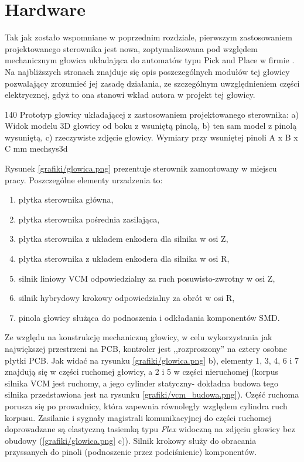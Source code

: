 \section{Hardware}

Tak jak zostało wspomniane w poprzednim rozdziale, pierwszym zastosowaniem projektowanego sterownika jest nowa, zoptymalizowana pod względem mechanicznym głowica układająca do automatów typu Pick and Place w firmie \firma{}. Na najbliższych stronach znajduje się opis poszczególnych modułów tej głowicy pozwalający zrozumieć jej zasadę działania, ze szczególnym uwzględnieniem części elektrycznej, gdyż to ona stanowi wkład autora w projekt tej głowicy.

	{140}
	{Prototyp głowicy układającej z zastosowaniem projektowanego sterownika: a) Widok modelu 3D głowicy od boku z wsuniętą pinolą, b) ten sam model z pinolą wysuniętą, c) rzeczywiste zdjęcie głowicy. Wymiary przy wsuniętej pinoli A x B x C mm}
	{mechsys3d}

Rysunek \ref{grafiki/glowica.png} prezentuje sterownik zamontowany w miejscu pracy. Poszczególne elementy urzadzenia to:

\begin{enumerate}
	\item płytka sterownika główna,
	\item płytka sterownika pośrednia zasilająca,
	\item płytka sterownika z układem enkodera dla silnika w osi Z,
	\item płytka sterownika z układem enkodera dla silnika w osi R,
	\item silnik liniowy VCM odpowiedzialny za ruch posuwisto-zwrotny w osi Z,
	\item silnik hybrydowy krokowy odpowiedzialny za obrót w osi R,
	\item pinola głowicy służąca do podnoszenia i odkładania komponentów SMD.
\end{enumerate}

Ze względu na konstrukcję mechaniczną głowicy, w celu wykorzystania jak największej przestrzeni na PCB, kontroler jest ,,rozproszony'' na cztery osobne płytki PCB. Jak widać na rysunku \ref{grafiki/glowica.png} b), elementy 1, 3, 4, 6 i 7 znajdują się w części ruchomej głowicy, a 2 i 5 w części nieruchomej (korpus silnika VCM jest ruchomy, a jego cylinder statyczny- dokładna budowa tego silnika przedstawiona jest na rysunku \ref{grafiki/vcm_budowa.png}). Część ruchoma porusza się po prowadnicy, która zapewnia równoległy względem cylindra ruch korpusu. Zasilanie i sygnały magistrali komunikacyjnej do części ruchomej doprowadzane są elastyczną tasiemką typu {\it Flex} widoczną na zdjęciu głowicy bez obudowy (\ref{grafiki/glowica.png} c)). Silnik krokowy służy do obracania przyssanych do pinoli (podnoszenie przez podciśnienie) komponentów. \\


